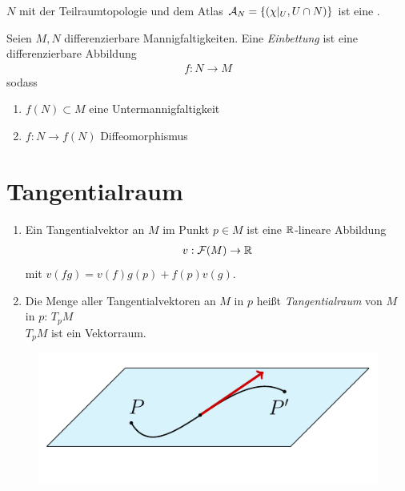\begin{bem}
$N$ mit der Teilraumtopologie und dem Atlas $\mathcal{A}_N = \left\{(\chi\vert_U, U\cap N)\right\}$ ist eine \difM.
\end{bem}

\begin{defs}
Seien $M, N$ differenzierbare Mannigfaltigkeiten. Eine \textit{Einbettung} ist eine differenzierbare Abbildung
\begin{align*}
f: N \rightarrow M
\end{align*}
sodass
\begin{enumerate}
\item$f(N)\subset M$ eine Untermannigfaltigkeit 
\item$f: N \rightarrow f(N)$ Diffeomorphismus
\end{enumerate}
\end{defs}

\section{Tangentialraum} 


\begin{defs}
\begin{enumerate}
\item Ein Tangentialvektor an $M$ im Punkt $p \in M$ ist eine $\mathbb{R}$-lineare Abbildung
\begin{align*}
v: \mathcal{F}(M) \rightarrow \mathbb{R}
\end{align*}
mit $v(fg) = v(f)g(p) + f(p)v(g)$.
\item Die Menge aller Tangentialvektoren an $M$ in $p$ heißt \textit{Tangentialraum} von $M$ in $p$: $T_pM$\\
$T_pM$ ist ein Vektorraum.
\end{enumerate}

\begin{figure}[H]
\centering
\includegraphics[scale=1]{figures/tikz/tangentline.pdf}
\end{figure}

\end{defs}
